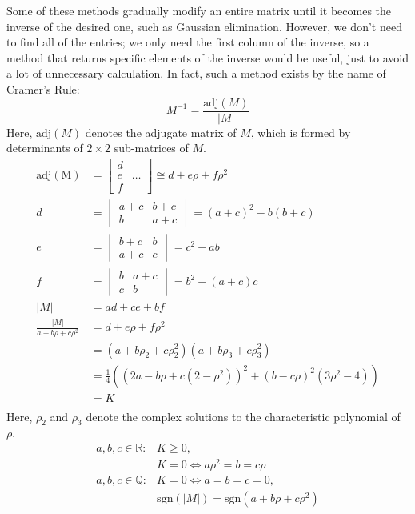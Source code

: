 \documentclass{article}
\begin{document}
Some of these methods gradually modify an entire matrix
until it becomes the inverse of the desired one,
such as Gaussian elimination.
However, we don't need to find all of the entries;
we only need the first column of the inverse,
so a method that returns specific elements of the inverse would be useful,
just to avoid a lot of unnecessary calculation.
In fact, such a method exists by the name of Cramer's Rule:
\[M^{-1} = \frac{\mathrm{adj}(M)}{\lvert M \rvert}\]
Here, $\mathrm{adj}(M)$ denotes the adjugate matrix of $M$,
which is formed by determinants of $2 \times 2$ sub-matrices of $M$.
\begin{align*}
  \mathrm{adj(M)} &=
  \begin{bmatrix}
    d & \\
    e & \hdots \\
    f &
  \end{bmatrix}
  \cong d+e\rho+f\rho^2 \\
  d &=
  \begin{vmatrix}
    a+c & b+c \\
    b & a+c
  \end{vmatrix} =
  (a+c)^2-b(b+c) \\
  e &=
  \begin{vmatrix}
    b+c & b \\
    a+c & c
  \end{vmatrix} =
  c^2-ab \\
  f &=
  \begin{vmatrix}
    b & a+c \\
    c & b
  \end{vmatrix} =
  b^2-(a+c)c \\
  \lvert M \rvert &= ad+ce+bf \\
  \frac{\lvert M \rvert}{a+b\rho+c\rho^2}
  &= d+e\rho+f\rho^2 \\
  &= (a+b\rho_2+c\rho_2^2)(a+b\rho_3+c\rho_3^2) \\
  &= \frac{1}{4}\left((2a-b\rho+c(2-\rho^2))^2+(b-c\rho)^2(3\rho^2-4)\right) \\
  &= K \\
\end{align*}
Here, $\rho_2$ and $\rho_3$ denote the complex solutions
to the characteristic polynomial of $\rho$.
\begin{align*}
  a, b, c \in \mathbb{R}: & K \geq 0, \\
  & K = 0 \iff a\rho^2 = b = c\rho \\
  a, b, c \in \mathbb{Q}: & K = 0 \iff a = b = c = 0, \\
  & \mathrm{sgn}(\lvert M \rvert) = \mathrm{sgn}(a+b\rho+c\rho^2) \\
\end{align*}
\end{document}
